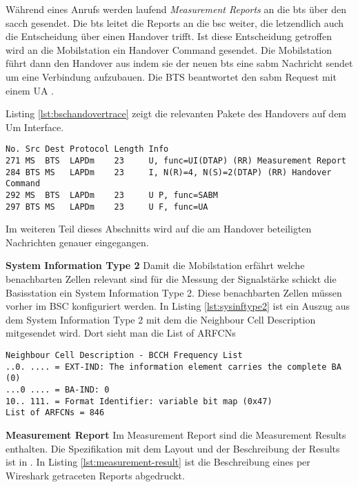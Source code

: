 Während eines Anrufs werden laufend \textit{Measurement Reports} an die \gls{bts} über den \gls{sacch} gesendet. Die \gls{bts} leitet die Reports an die \gls{bsc} weiter, die letzendlich auch die Entscheidung über einen Handover trifft. Ist diese Entscheidung getroffen wird an die Mobilstation ein Handover Command gesendet. Die Mobilstation führt dann den Handover aus indem sie der neuen \gls{bts} eine \gls{sabm} Nachricht sendet um eine Verbindung aufzubauen. Die BTS beantwortet den \gls{sabm} Request mit einem \gls{UA} \cite[3.4.4]{bib:3gpp0408}\cite[3.1.5]{bib:3gpp0408} \cite[1.7.4]{bib:grundkursmks}.

Listing \ref{lst:bschandovertrace} zeigt die relevanten Pakete des Handovers auf dem Um Interface.

\begin{lstlisting}[label=lst:bschandovertrace,caption={Übersicht über die gesendeten Pakete auf dem Um Interface},numbers=none]
No. Src Dest Protocol Length Info
271	MS	BTS  LAPDm	  23     U, func=UI(DTAP) (RR) Measurement Report 
284	BTS	MS   LAPDm	  23     I, N(R)=4, N(S)=2(DTAP) (RR) Handover Command 
292	MS  BTS  LAPDm    23     U P, func=SABM
297	BTS MS   LAPDm	  23     U F, func=UA
\end{lstlisting}

Im weiteren Teil dieses Abschnitts wird auf die am Handover beteiligten Nachrichten genauer eingegangen.

\textbf{System Information Type 2}
Damit die Mobilstation erfährt welche benachbarten Zellen relevant sind für die Messung der Signalstärke schickt die Basisstation ein System Information Type 2. Diese benachbarten Zellen müssen vorher im BSC konfiguriert werden. In Listing \ref{lst:sysinftype2} ist ein Auszug aus dem System Information Type 2 mit dem die Neighbour Cell Description mitgesendet wird. Dort sieht man die List of \glspl{ARFCN}

\begin{lstlisting}[label=lst:sysinftype2,caption={Nachbarzellen im System Information Type 2}]
Neighbour Cell Description - BCCH Frequency List
..0. .... = EXT-IND: The information element carries the complete BA (0)
...0 .... = BA-IND: 0
10.. 111. = Format Identifier: variable bit map (0x47)
List of ARFCNs = 846
\end{lstlisting}

\textbf{Measurement Report}
Im Measurement Report sind die Measurement Results enthalten. Die Spezifikation mit dem Layout und der Beschreibung der Results ist in \cite[10.5.2.20]{bib:3gpp0408}. In Listing \ref{lst:measurement-result} ist die Beschreibung eines per Wireshark getraceten Reports abgedruckt.

